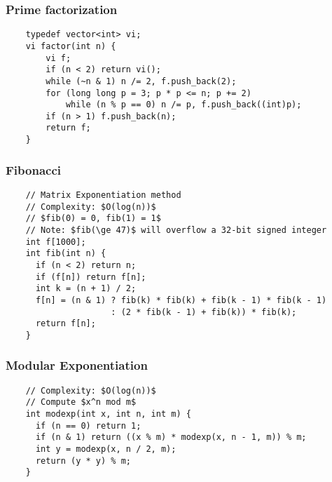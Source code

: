 \documentclass{article}
\begin{document}
\subsubsection{Prime factorization}
\begin{verbatim}
    typedef vector<int> vi;
    vi factor(int n) {
        vi f;
        if (n < 2) return vi();
        while (~n & 1) n /= 2, f.push_back(2);
        for (long long p = 3; p * p <= n; p += 2) 
            while (n % p == 0) n /= p, f.push_back((int)p);
        if (n > 1) f.push_back(n);
        return f;
    }
\end{verbatim}

\subsubsection{Fibonacci}
\begin{verbatim}
    // Matrix Exponentiation method
    // Complexity: $O(log(n))$
    // $fib(0) = 0, fib(1) = 1$
    // Note: $fib(\ge 47)$ will overflow a 32-bit signed integer
    int f[1000];
    int fib(int n) {
      if (n < 2) return n;
      if (f[n]) return f[n];
      int k = (n + 1) / 2;
      f[n] = (n & 1) ? fib(k) * fib(k) + fib(k - 1) * fib(k - 1)
                     : (2 * fib(k - 1) + fib(k)) * fib(k);
      return f[n];
    }
\end{verbatim}

\subsubsection{Modular Exponentiation}
\begin{verbatim}
    // Complexity: $O(log(n))$
    // Compute $x^n mod m$
    int modexp(int x, int n, int m) {
      if (n == 0) return 1;
      if (n & 1) return ((x % m) * modexp(x, n - 1, m)) % m;
      int y = modexp(x, n / 2, m);
      return (y * y) % m;
    }
\end{verbatim}
\end{document}
